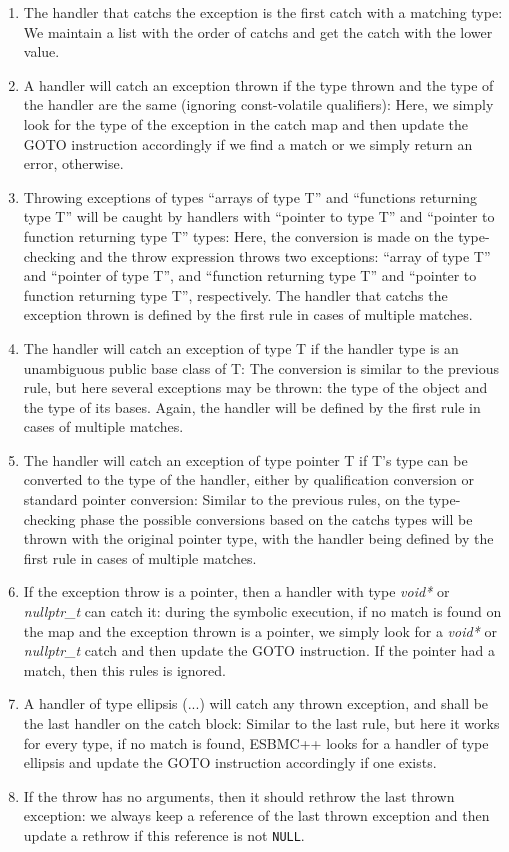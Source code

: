 \documentclass[conference]{IEEEtran}
\begin{document}
\begin{enumerate}
 \item The handler that catchs the exception is the first catch with a matching type: We maintain a list with the order of
       catchs and get the catch with the lower value.
 \item A handler will catch an exception thrown if the type thrown and the type of the handler are the same (ignoring const-volatile
       qualifiers): Here, we simply look for the type of the exception in the catch map and then update the GOTO instruction accordingly 
       if we find a match or we simply return an error, otherwise.
 \item Throwing exceptions of types 
  ``arrays of type T'' and ``functions returning type T'' will be caught by handlers with ``pointer to type T'' and
       ``pointer to function returning type T'' types: Here, the conversion is made on the type-checking and the throw expression 
       throws two exceptions: ``array of type T'' and ``pointer of type T'', and ``function returning type T'' and ``pointer to function 
       returning type T'', respectively. The handler that catchs the exception thrown is defined by the first rule in cases of 
       multiple  matches.
 \item The handler will catch an exception of type T if the handler type is an unambiguous public base class of T: The conversion is 
       similar to the previous rule, but here several exceptions may be thrown: the type of the object and the 
       type of its bases. Again, the handler will be defined by the first rule in cases of multiple matches.
 \item The handler will catch an exception of type pointer T if T's type can be converted to the type of the handler, either by
       qualification conversion or standard pointer conversion: Similar to the previous rules, on the type-checking phase the possible
       conversions based on the catchs types will be thrown with the original pointer type, with the handler being defined by the first 
       rule in cases of multiple matches.
 \item If the exception throw is a pointer, then a handler with type \textit{void*} or \textit{nullptr\_t} can catch it: during the 
       symbolic execution, if no match is found on the map and the exception thrown is a pointer, we simply look for a 
       \textit{void*} or \textit{nullptr\_t} catch and then update the GOTO instruction. If the pointer had a match, then this rules is 
       ignored.
 \item A handler of type ellipsis (...) will catch any thrown exception, and shall be the last handler on the catch block: Similar to the
       last rule, but here it works for every type, if no match is found, ESBMC++ looks for a handler of type ellipsis and update the GOTO
       instruction accordingly if one exists.
 \item If the throw has no arguments, then it should rethrow the last thrown exception: we always keep a reference of the last 
       thrown exception and then update a rethrow if this reference is not \verb|NULL|.
\end{enumerate}
\end{document}
